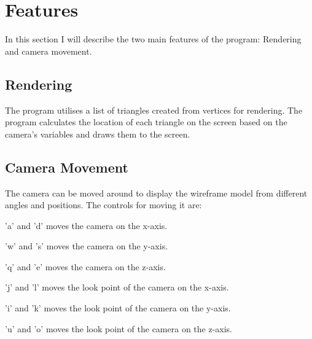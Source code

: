 \section{Features}
\label{02}

In this section I will describe the two main features of the program: Rendering and camera movement.

\subsection{Rendering}
\label{02_01}
The program utilises a list of triangles created from vertices for rendering. The program calculates the location of each triangle on the screen based on the camera's variables and draws them to the screen.

\subsection{Camera Movement}
\label{02_02}
The camera can be moved around to display the wireframe model from different angles and positions. The controls for moving it are:
\begin{my_itemize}
	\item 'a' and 'd' moves the camera on the x-axis.
	\item 'w' and 's' moves the camera on the y-axis.
	\item 'q' and 'e' moves the camera on the z-axis.
	\item 'j' and 'l' moves the look point of the camera on the x-axis.
	\item 'i' and 'k' moves the look point of the camera on the y-axis.
	\item 'u' and 'o' moves the look point of the camera on the z-axis.
\end{my_itemize}
